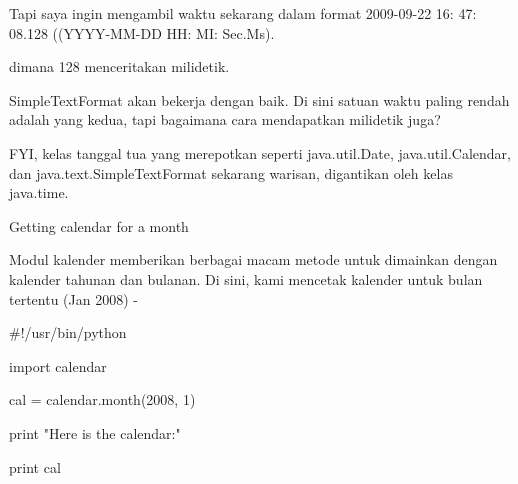 \vspace{12pt}
\vspace{12pt}
\vspace{12pt}
\vspace{12pt}
\vspace{12pt}
\vspace{12pt}
\vspace{12pt}
\noindent 
Tapi saya ingin mengambil waktu sekarang dalam format 2009-09-22 16: 47: 08.128 ((YYYY-MM-DD HH: MI: Sec.Ms). \par
\vspace{12pt}
\noindent 
dimana 128 menceritakan milidetik. \par
\vspace{12pt}
\noindent 
SimpleTextFormat akan bekerja dengan baik. Di sini satuan waktu paling rendah adalah yang kedua, tapi bagaimana cara mendapatkan milidetik juga? \par
\noindent 
FYI, kelas tanggal tua yang merepotkan seperti java.util.Date, java.util.Calendar, dan java.text.SimpleTextFormat sekarang warisan, digantikan oleh kelas java.time. \par
\vspace{12pt}
\vspace{14pt}
\noindent 
{\fontsize{14pt}{14pt}\selectfont Getting calendar for a month \\} \par
\noindent 
Modul kalender memberikan berbagai macam metode untuk dimainkan dengan kalender tahunan dan bulanan. Di sini, kami mencetak kalender untuk bulan tertentu (Jan 2008) - \par
\noindent 
 \hspace*{0.5in}  $  \#  $!/usr/bin/python \par
\noindent 
 \hspace*{0.5in} import calendar \par
\vspace{12pt}
\noindent 
 \hspace*{0.5in} cal = calendar.month(2008, 1) \par
\noindent 
 \hspace*{0.5in} print "Here is the calendar:" \par
\noindent 
 \hspace*{0.5in} print cal \par
\vspace{12pt}
\vspace{12pt}
\vspace{12pt}
\vspace{12pt}
